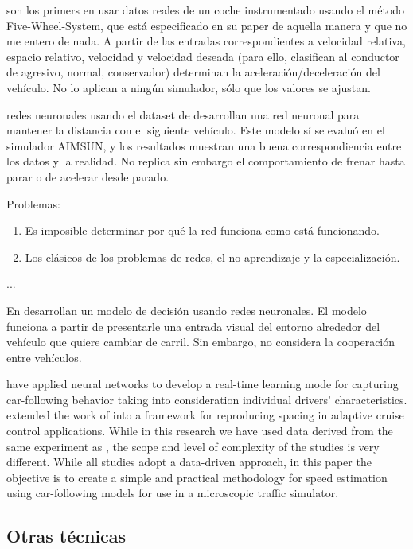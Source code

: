 \cite{Jia2003} son los primers en usar datos reales de un coche instrumentado usando el método Five-Wheel-System, que está especificado en su paper de aquella manera y que no me entero de nada. A partir de las entradas correspondientes a velocidad relativa, espacio relativo, velocidad y velocidad deseada (para ello, clasifican al conductor de agresivo, normal, conservador) determinan la aceleración/deceleración del vehículo. No lo aplican a ningún simulador, sólo que los valores se ajustan.

\cite{Panwai2007} redes neuronales usando el dataset de \cite{Manstetten1997} desarrollan una red neuronal para mantener la distancia con el siguiente vehículo. Este modelo sí se evaluó en el simulador AIMSUN, y los resultados muestran una buena correspondiencia entre los datos y la realidad. No replica sin embargo el comportamiento de frenar hasta parar o de acelerar desde parado.

\cite{Khodayari2012}


Problemas:

\begin{enumerate}
	\item Es imposible determinar por qué la red funciona como está funcionando.
	\item Los clásicos de los problemas de redes, el no aprendizaje y la especialización.
\end{enumerate}

...

En \cite{Hunt1994} desarrollan un modelo de decisión usando redes neuronales. El modelo funciona a partir de presentarle una entrada visual del entorno alrededor del vehículo que quiere cambiar de carril. Sin embargo, no considera la cooperación entre vehículos.

\cite{Simonelli2009} have applied neural networks to develop a real-time learning mode for capturing car-following behavior taking into consideration individual drivers’ characteristics. \cite{Bifulco2014} extended the work of \cite{Simonelli2009} into a framework for reproducing spacing in adaptive cruise control applications. While in this research we have used data derived from the same experiment as \cite{Simonelli2009}, the scope and level of complexity of the studies is very different. While all studies adopt a data-driven approach, in this paper the objective is to create a simple and practical methodology for speed estimation using car-following models for use in a microscopic traffic simulator.

\subsection{Otras técnicas}

